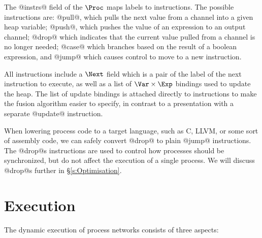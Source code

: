 The @instrs@ field of the $\Proc$ maps labels to instructions. The possible instructions are: @pull@, which pulls the next value from a channel into a given heap variable; @push@, which pushes the value of an expression to an output channel;  @drop@ which indicates that the current value pulled from a channel is no longer needed; @case@ which branches based on the result of a boolean expression, and @jump@ which causes control to move to a new instruction.

All instructions include a $\Next$ field which is a pair of the label of the next instruction to execute, as well as a list of $\Var \times \Exp$ bindings used to update the heap. The list of update bindings is attached directly to instructions to make the fusion algorithm easier to specify, in contrast to a presentation with a separate @update@ instruction. 

When lowering process code to a target language, such as C, LLVM, or some sort of assembly code, we can safely convert @drop@ to plain @jump@ instructions. The @drop@s instructions are used to control how processes should be synchronized, but do not affect the execution of a single process. We will discuss @drop@s further in \S\ref{s:Optimisation}.




\section{Execution}
\label{s:Process:Eval}

The dynamic execution of process networks consists of three aspects:

